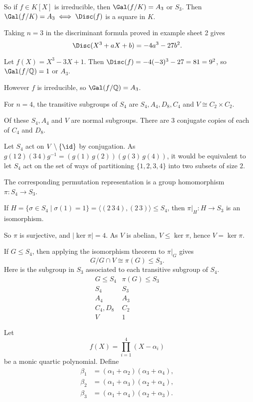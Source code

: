 \documentclass[12pt]{article}
\begin{document}
So if $f \in K[X]$ is irreducible, then $\Gal(f/K) = A_3$ or $S_3$. Then $\Gal(f/K) = A_3 \iff \Disc(f)$ is a square in $K$.

Taking $n = 3$ in the discriminant formula proved in example sheet 2 gives
\[
\Disc(X^3 + aX + b) = -4a^3 - 27b^2.
\]

\begin{exbox}
	Let $f(X) = X^3 - 3X + 1$. Then $\Disc(f) = -4(-3)^3 - 27 = 81 = 9^2$, so $\Gal(f/\mathbb{Q}) = 1$ or $A_3$.

	However $f$ is irreducible, so $\Gal(f/\mathbb{Q}) = A_3$.
\end{exbox}

For $n = 4$, the transitive subgroups of $S_4$ are $S_4, A_4, D_8, C_4$ and $V \cong C_2 \times C_2$.

Of these $S_4, A_4$ and $V$ are normal subgroups. There are 3 conjugate copies of each of $C_4$ and $D_8$.

Let $S_4$ act on $V \setminus \{\id\}$ by conjugation. As $g(1\, 2)(3\, 4) g^{-1} = (g(1) \, g(2))(g(3) \, g(4))$, it would be equivalent to let $S_4$ act on the set of ways of partitioning $\{1, 2, 3, 4\}$ into two subsets of size $2$.

The corresponding permutation representation is a group homomorphism $\pi : S_4 \to S_3$.

If $H = \{\sigma \in S_4 \mid \sigma(1) = 1\} = \langle(2 \, 3 \, 4),(2\, 3)\rangle \leq S_4$, then $\pi|_H : H \to S_3$ is an isomorphism.

So $\pi$ is surjective, and $|\!\ker \pi|= 4$. As $V$ is abelian, $V \leq \ker \pi$, hence $V = \ker \pi$.

If $G \leq S_4$, then applying the isomorphism theorem to $\pi|_G$ gives
\[
G / G \cap V \cong \pi(G) \leq S_3.
\]
Here is the subgroup in $S_3$ associated to each transitive subgroup of $S_4$.
\[
\begin{array}{c|c}
	G \leq S_4 & \pi(G) \leq S_3 \\
	\hline
	S_4 & S_3 \\
	A_4 & A_3 \\
	C_4, D_8 & C_2 \\
	V & 1
\end{array}
\]


Let
\[
f(X) = \prod_{i = 1}^4 (X - \alpha_i)
\]
be a monic quartic polynomial. Define
\begin{align*}
	\beta_1 &= (\alpha_1 + \alpha_2)(\alpha_3 + \alpha_4),\\
	\beta_2 &= (\alpha_1 + \alpha_3)(\alpha_2 + \alpha_4),\\
	\beta_3 &= (\alpha_1+\alpha_4)(\alpha_2+\alpha_3).
\end{align*}
\end{document}
